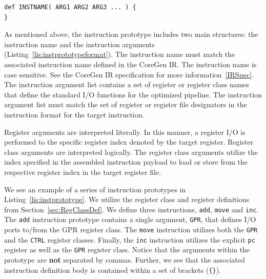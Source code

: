 \documentclass{article}
\begin{document}
\vspace{0.125in}
\begin{lstlisting}[frame=single,style=base,caption={Instruction Prototype Format},captionpos=b,label={lis:instprototypeformat}]
def INSTNAME( ARG1 ARG2 ARG3 ... ) {
}
\end{lstlisting}

As mentioned above, the instruction prototype includes two main structures: the instruction 
name and the instruction arguments (Listing~\ref{lis:instprototypeformat}).  The instruction name must match the associated instruction 
name defined in the CoreGen IR.  The instruction name is case sensitive.  
See the CoreGen IR specification for more information~\ref{IRSpec}.  The instruction 
argument list contains a set of register or register class names that define the standard I/O functions 
for the optimized pipeline.  The instruction argument list must match the set of register or register file designators 
in the instruction format for the target instruction. 
  
Register arguments are interpreted literally.  In this manner, a register I/O is performed to the specific 
register index denoted by the target register.  Register class arguments are interpreted logically.  The register 
class arguments utilize the index specified in the assembled instruction payload to load or store from the respective 
register index in the target register file.  

We see an example of a series of instruction prototypes in Listing~\ref{lis:instprototype}.  We utilize the register class 
and register definitions from Section~\ref{sec:RegClassDef}.  We define three instructions, \texttt{add}, \texttt{move} 
and \texttt{inc}.  The \texttt{add} instruction prototype contains a single argument, \texttt{GPR}, that defines I/O ports 
to/from the GPR register class.  The \texttt{move} instruction utilizes both the \texttt{GPR} and the \texttt{CTRL} 
register classes.  Finally, the \texttt{inc} instruction utilizes the explicit \texttt{pc} register as well as the \texttt{GPR} 
register class.  Notice that the arguments within the prototype are \textbf{not} separated by commas.  Further, we see 
that the associated instruction definition body is contained within a set of brackets (\texttt{\{\}}).  
\end{document}
